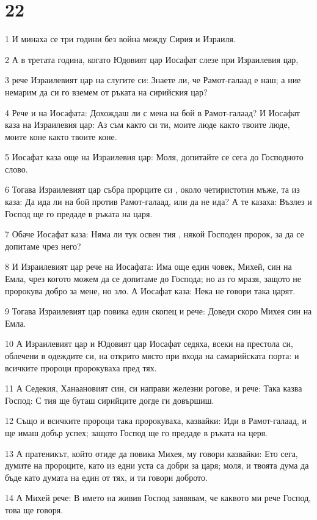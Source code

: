 \chapter{22}

\par 1 И минаха се три години без война между Сирия и Израиля.
\par 2 А в третата година, когато Юдовият цар Иосафат слезе при Израилевия цар,
\par 3 рече Израилевият цар на слугите си: Знаете ли, че Рамот-галаад е наш; а ние немарим да си го вземем от ръката на сирийския цар?
\par 4 Рече и на Иосафата: Дохождаш ли с мена на бой в Рамот-галаад? И Иосафат каза на Израилевия цар: Аз съм както си ти, моите люде както твоите люде, моите коне както твоите коне.
\par 5 Иосафат каза още на Израилевия цар: Моля, допитайте се сега до Господното слово.
\par 6 Тогава Израилевият цар събра прорците си , около четиристотин мъже, та из каза: Да ида ли на бой против Рамот-галаад, или да не ида? А те казаха: Възлез и Господ ще го предаде в ръката на царя.
\par 7 Обаче Иосафат каза: Няма ли тук освен тия , някой Господен пророк, за да се допитаме чрез него?
\par 8 И Израилевият цар рече на Иосафата: Има още един човек, Михей, син на Емла, чрез когото можем да се допитаме до Господа; но аз го мразя, защото не пророкува добро за мене, но зло. А Иосафат каза: Нека не говори така царят.
\par 9 Тогава Израилевият цар повика един скопец и рече: Доведи скоро Михея син на Емла.
\par 10 А Израилевият цар и Юдовият цар Иосафат седяха, всеки на престола си, облечени в одеждите си, на открито място при входа на самарийската порта: и всичките пророци пророкуваха пред тях.
\par 11 А Седекия, Ханаановият син, си направи железни рогове, и рече: Така казва Господ: С тия ще буташ сирийците догде ги довършиш.
\par 12 Също и всичките пророци така пророкуваха, казвайки: Иди в Рамот-галаад, и ще имаш добър успех; защото Господ ще го предаде в ръката на церя.
\par 13 А пратеникът, който отиде да повика Михея, му говори казвайки: Ето сега, думите на пророците, като из едни уста са добри за царя; моля, и твоята дума да бъде като думата на един от тях, и ти говори доброто.
\par 14 А Михей рече: В името на живия Господ заявявам, че каквото ми рече Господ, това ще говоря.
